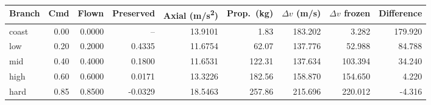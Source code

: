 \begin{table}[t]
\centering
\caption{}
\label{tab:retrofork}
\footnotesize
\begin{tabular}{@{}lrrrrrrrr@{}}
\toprule
Branch & Cmd & Flown & Preserved & Axial (\si{m/s^2}) & Prop.\ (kg) & $\Delta v$ (\si{m/s}) & $\Delta v$ frozen & Difference \\
\midrule
coast & 0.00 & 0.0000 & --      & 13.9101 & 1.83   & 183.202 & 3.282   & 179.920 \\
low   & 0.20 & 0.2000 & 0.4335  & 11.6754 & 62.07  & 137.776 & 52.988  & 84.788 \\
mid   & 0.40 & 0.4000 & 0.1800  & 11.6531 & 122.31 & 137.634 & 103.394 & 34.240 \\
high  & 0.60 & 0.6000 & 0.0171  & 13.3226 & 182.56 & 158.870 & 154.650 & 4.220 \\
hard  & 0.85 & 0.8500 & -0.0329 & 18.5463 & 257.86 & 215.696 & 220.012 & -4.316 \\
\bottomrule
\end{tabular}
\end{table}
